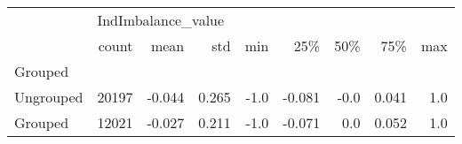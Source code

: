 \begin{tabular}{lrrrrrrrr}
\toprule
{} & \multicolumn{8}{l}{IndImbalance\_value} \\
{} &              count &   mean &    std &  min &    25\% &  50\% &    75\% &  max \\
Grouped   &                    &        &        &      &        &      &        &      \\
\midrule
Ungrouped &              20197 & -0.044 &  0.265 & -1.0 & -0.081 & -0.0 &  0.041 &  1.0 \\
Grouped   &              12021 & -0.027 &  0.211 & -1.0 & -0.071 &  0.0 &  0.052 &  1.0 \\
\bottomrule
\end{tabular}
